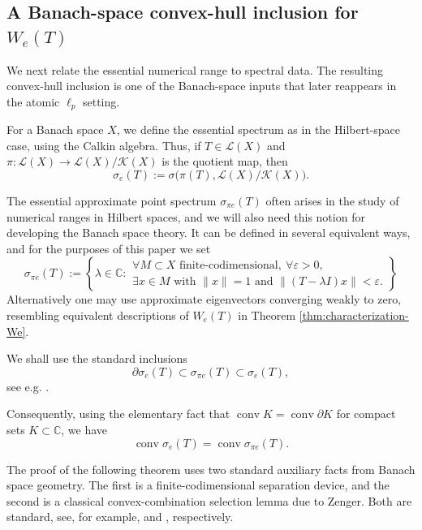 \documentclass[11pt]{amsart}
\numberwithin{equation}{section}
\theoremstyle{definition}
\theoremstyle{remark}
\newcommand{\C}{\mathbb{C}}
\newcommand{\e}{\varepsilon}
\newcommand{\We}{W_e}
\begin{document}
\subsection{A Banach-space convex-hull inclusion for $\We(T)$}

We next relate the essential numerical range to spectral data. The resulting convex-hull inclusion is one of the Banach-space inputs that later reappears in the atomic $\ell_p$ setting.

For a Banach space $X$, we define the essential spectrum as in the Hilbert-space case, using the Calkin algebra. Thus, if $T\in\mathcal L(X)$ and $\pi:\mathcal L(X)\to\mathcal L(X)/\mathcal K(X)$ is the quotient map, then
\[
        \sigma_e(T):=\sigma\bigl(\pi(T),\mathcal L(X)/\mathcal K(X)\bigr).
\]

The essential approximate point spectrum $\sigma_{\pi e}(T)$ often arises in the study of numerical ranges in Hilbert spaces, 
and we will also need this notion for developing the Banach space theory. It can be defined in several equivalent ways, and  for the purposes of this paper
we set
\[
\sigma_{\pi e}(T):=
\left\{\lambda\in\C:
\begin{array}{l}
\forall M\subset X\text{ finite-codimensional},\ \forall\e>0,\\[1mm]
\exists x\in M\text{ with }\|x\|=1\text{ and }\|(T-\lambda I)x\|<\e.
\end{array}
\right\}
\]
Alternatively one may use approximate eigenvectors converging weakly to zero, resembling equivalent descriptions of $W_e(T)$ in 
Theorem \ref{thm:characterization-We}.

 We shall use the standard inclusions
\[
        \partial\sigma_e(T)\subset\sigma_{\pi e}(T)\subset\sigma_e(T),
\]
see e.g. \cite[Chapter III.19, Proposition 1]{MullerBook}.

Consequently, using the elementary fact that
\(\operatorname{conv}K=\operatorname{conv}\partial K\) for compact
sets \(K\subset\mathbb C\), we have
\begin{equation}\label{eq:conv-sigmae-sigmapie}
        \operatorname{conv}\sigma_e(T)
        =
        \operatorname{conv}\sigma_{\pi e}(T).
\end{equation}

The proof of the following theorem uses two standard auxiliary facts from
Banach space geometry. The first is a finite-codimensional separation device,
and the second is a classical convex-combination selection lemma due to
Zenger. Both are standard, see, for example, \cite[p.~329]{MullerBook}
and \cite[p.~20]{BD2}, respectively.
\end{document}
